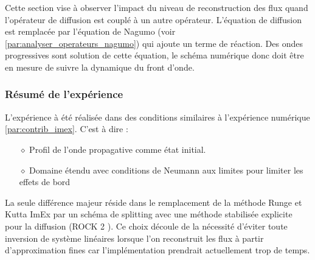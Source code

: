 Cette section vise à observer l'impact du niveau de reconstruction des flux quand l'opérateur de diffusion est couplé à un autre opérateur. 
L'équation de diffusion est remplacée par l'équation de Nagumo (voir \ref{par:analyser_operateurs_nagumo}) qui ajoute un terme de réaction. 
Des ondes progressives sont solution de cette équation, le schéma numérique donc doit être en mesure de suivre la dynamique du front d'onde.

\subsubsection{Résumé de l'expérience}
L'expérience à été réalisée dans des conditions similaires à l'expérience numérique \ref{par:contrib_imex}. 
C'est à dire :
\begin{itemize}
    \item[$\diamond$] Profil de l'onde propagative comme état initial.
    \item[$\diamond$] Domaine étendu avec conditions de Neumann aux limites pour limiter les effets de bord
\end{itemize}
La seule différence majeur réside dans le remplacement de la méthode Runge et Kutta ImEx par un schéma de splitting avec une méthode stabilisée explicite pour la diffusion (ROCK 2 \cite{AbdulleMedovikov2001}).
Ce choix découle de la nécessité d'éviter toute inversion de système linéaires lorsque l'on reconstruit les flux à partir d'approximation 
fines car l’implémentation prendrait actuellement trop de temps.


